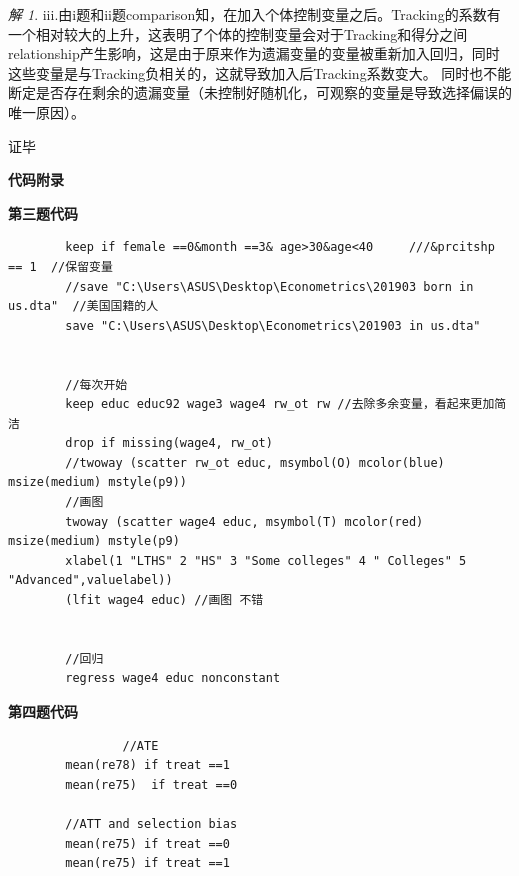 \documentclass[a4paper]{ctexart}
\theoremstyle{remark}
\newtheorem*{solution}{解}
\renewcommand{\qedsymbol}{证毕}
\begin{document}
\begin{itemize}
\begin{solution}
    iii.由i题和ii题comparison知，在加入个体控制变量之后。Tracking的系数有一个相对较大的上升，这表明了个体的控制变量会对于Tracking和得分之间relationship产生影响，这是由于原来作为遗漏变量的变量被重新加入回归，同时这些变量是与Tracking负相关的，这就导致加入后Tracking系数变大。
    同时也不能断定是否存在剩余的遗漏变量（未控制好随机化，可观察的变量是导致选择偏误的唯一原因）。

    \qedsymbol


\end{solution}

\newpage
{\fontsize{14pt}{16pt}\selectfont \textbf{代码附录}}

{\fontsize{8pt}{12pt}\selectfont \textbf{第三题代码}}
\lstset{language=Python,basicstyle=\ttfamily\small}
    \begin{lstlisting}
        keep if female ==0&month ==3& age>30&age<40     ///&prcitshp == 1  //保留变量
        //save "C:\Users\ASUS\Desktop\Econometrics\201903 born in us.dta"  //美国国籍的人
        save "C:\Users\ASUS\Desktop\Econometrics\201903 in us.dta"


        //每次开始
        keep educ educ92 wage3 wage4 rw_ot rw //去除多余变量，看起来更加简洁    
        drop if missing(wage4, rw_ot)
        //twoway (scatter rw_ot educ, msymbol(O) mcolor(blue) msize(medium) mstyle(p9)) 
        //画图
        twoway (scatter wage4 educ, msymbol(T) mcolor(red) msize(medium) mstyle(p9)
        xlabel(1 "LTHS" 2 "HS" 3 "Some colleges" 4 " Colleges" 5 "Advanced",valuelabel))
        (lfit wage4 educ) //画图 不错


        //回归
        regress wage4 educ nonconstant
    \end{lstlisting}

{\fontsize{8pt}{12pt}\selectfont \textbf{第四题代码}}
    \begin{lstlisting}
                //ATE
        mean(re78) if treat ==1 
        mean(re75)  if treat ==0

        //ATT and selection bias
        mean(re75) if treat ==0
        mean(re75) if treat ==1 




\end{lstlisting}
\end{itemize}
\end{document}
